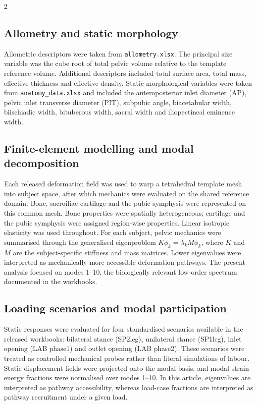 \documentclass[openacc]{rsproca_new}
\begin{document}
\begin{multicols}{2}
\subsection{Allometry and static morphology}

Allometric descriptors were taken from \texttt{allometry.xlsx}. The principal size variable was the cube root of total pelvic volume relative to the template reference volume. Additional descriptors included total surface area, total mass, effective thickness and effective density. Static morphological variables were taken from \texttt{anatomy\_data.xlsx} and included the anteroposterior inlet diameter (AP), pelvic inlet transverse diameter (PIT), subpubic angle, biacetabular width, biischiadic width, bituberous width, sacral width and iliopectineal eminence width.

\subsection{Finite-element modelling and modal decomposition}

Each released deformation field was used to warp a tetrahedral template mesh into subject space, after which mechanics were evaluated on the shared reference domain. Bone, sacroiliac cartilage and the pubic symphysis were represented on this common mesh. Bone properties were spatially heterogeneous; cartilage and the pubic symphysis were assigned region-wise properties. Linear isotropic elasticity was used throughout. For each subject, pelvic mechanics were summarised through the generalised eigenproblem $K\phi_k = \lambda_k M\phi_k$, where $K$ and $M$ are the subject-specific stiffness and mass matrices. Lower eigenvalues were interpreted as mechanically more accessible deformation pathways. The present analysis focused on modes 1--10, the biologically relevant low-order spectrum documented in the workbooks.

\subsection{Loading scenarios and modal participation}

Static responses were evaluated for four standardised scenarios available in the released workbooks: bilateral stance (SP2leg), unilateral stance (SP1leg), inlet opening (LAB phase1) and outlet opening (LAB phase2). These scenarios were treated as controlled mechanical probes rather than literal simulations of labour. Static displacement fields were projected onto the modal basis, and modal strain-energy fractions were normalised over modes 1--10. In this article, eigenvalues are interpreted as pathway accessibility, whereas load-case fractions are interpreted as pathway recruitment under a given load.


\end{multicols}
\end{document}
